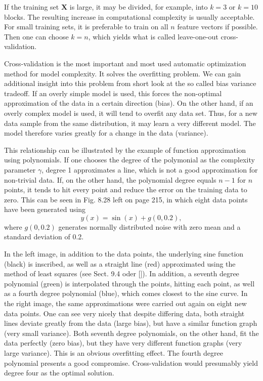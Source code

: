 \documentclass[10pt]{book}
\begin{document}
If the training set $\boldsymbol{X}$ is large, it may be divided, for example, into $k=3$ or $k=10$ blocks. The resulting increase in computational complexity is usually acceptable. For small training sets, it is preferable to train on all $n$ feature vectors if possible. Then one can choose $k=n$, which yields what is called leave-one-out cross-validation.

Cross-validation is the most important and most used automatic optimization method for model complexity. It solves the overfitting problem. We can gain additional insight into this problem from short look at the so called bias variance tradeoff. If an overly simple model is used, this forces the non-optimal approximation of the data in a certain direction (bias). On the other hand, if an overly complex model is used, it will tend to overfit any data set. Thus, for a new data sample from the same distribution, it may learn a very different model. The model therefore varies greatly for a change in the data (variance).

This relationship can be illustrated by the example of function approximation using polynomials. If one chooses the degree of the polymonial as the complexity parameter $\gamma$, degree 1 approximates a line, which is not a good approximation for non-trivial data. If, on the other hand, the polynomial degree equals $n-1$ for $n$ points, it tends to hit every point and reduce the error on the training data to zero. This can be seen in Fig. 8.28 left on page 215, in which eight data points have been generated using
\[
y(x)=\sin (x)+g(0,0.2),
\]
where $g(0,0.2)$ generates normally distributed noise with zero mean and a standard deviation of 0.2.

In the left image, in addition to the data points, the underlying sine function (black) is inscribed, as well as a straight line (red) approximated using the method of least squares (see Sect. 9.4 oder [\cite{ertel2015matheng}]). In addition, a seventh degree polynomial (green) is interpolated through the points, hitting each point, as well as a fourth degree polynomial (blue), which comes closest to the sine curve. In the right image, the same approximations were carried out again on eight new data points. One can see very nicely that despite differing data, both straight lines deviate greatly from the data (large bias), but have a similar function graph (very small variance). Both seventh degree polynomials, on the other hand, fit the data perfectly (zero bias), but they have very different function graphs (very large variance). This is an obvious overfitting effect. The fourth degree polynomial presents a good compromise. Cross-validation would presumably yield degree four as the optimal solution.
\end{document}
